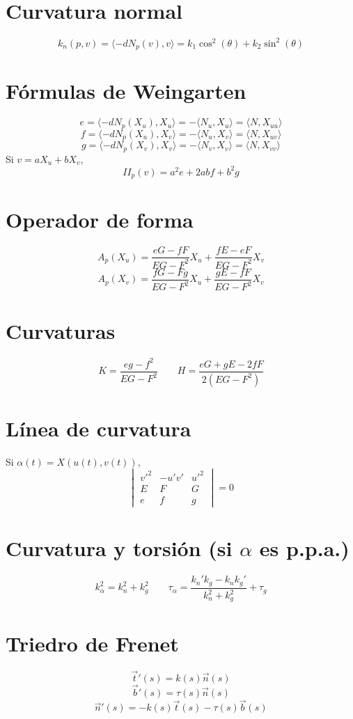 \documentclass[10pt]{article}
\begin{document}
\scriptsize
\begin{multicols}{3}

\section*{Curvatura normal}
\[
k_n(p, v) = \langle -dN_p(v), v \rangle = k_1 \cos^2(\theta) + k_2 \sin^2(\theta)
\]

\section*{Fórmulas de Weingarten}
\[
e = \langle -dN_p(X_u), X_u \rangle = - \langle N_u, X_u \rangle = \langle N, X_{uu} \rangle
\]
\[
f = \langle -dN_p(X_u), X_v \rangle = - \langle N_u, X_v \rangle = \langle N, X_{uv} \rangle
\]
\[
g = \langle -dN_p(X_v), X_v \rangle = - \langle N_v, X_v \rangle = \langle N, X_{vv} \rangle
\]
Si $v = aX_u + bX_v$,
\[
II_p(v) = a^2 e + 2abf + b^2 g
\]

\section*{Operador de forma}
\[
A_p(X_u) =
\frac{eG - fF}{EG - F^2} X_u +
\frac{fE - eF}{EG - F^2} X_v
\]
\[
A_p(X_v) =
\frac{fG - Fg}{EG - F^2} X_u +
\frac{gE - fF}{EG - F^2} X_v
\]

\section*{Curvaturas}
\[
K = \frac{eg - f^2}{EG - F^2}
\qquad
H = \frac{eG + gE - 2fF}{2(EG - F^2)}
\]

\section*{Línea de curvatura}
Si $\alpha(t) = X(u(t), v(t))$,
\[
\begin{vmatrix}
v'^2 & -u'v' & u'^2 \\
E & F & G \\
e & f & g
\end{vmatrix} = 0
\]

\section*{Curvatura y torsión (si $\alpha$ es p.p.a.)}
\[
k_\alpha^2 = k_n^2 + k_g^2
\qquad
\tau_\alpha =
\frac{k_n' k_g - k_n k_g'}{k_n^2 + k_g^2} + \tau_g
\]

\section*{Triedro de Frenet}
\[
\vec{t}'(s) = k(s) \vec{n}(s)
\]
\[
\vec{b}'(s) = \tau(s) \vec{n}(s)
\]
\[
\vec{n}'(s) = -k(s)\vec{t}(s) - \tau(s)\vec{b}(s)
\]


\end{multicols}
\end{document}

